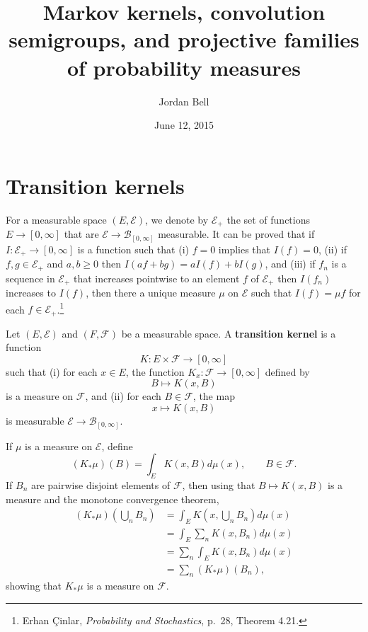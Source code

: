 \documentclass{article}
\theoremstyle{definition}
\begin{document}
\title{Markov kernels, convolution semigroups, and projective families of probability measures}
\author{Jordan Bell}
\date{June 12, 2015}

\maketitle


\section{Transition kernels}
For a measurable space $(E,\mathscr{E})$, we denote by $\mathscr{E}_+$ the set of functions $E \to [0,\infty]$
that are $\mathscr{E} \to \mathscr{B}_{[0,\infty]}$ measurable. 
It can be proved that if $I:\mathscr{E}_+ \to [0,\infty]$ is a function such that
(i) $f=0$ implies that $I(f)=0$, (ii) if $f,g \in \mathscr{E}_+$ and $a,b \geq 0$ then
$I(af+bg)=aI(f)+bI(g)$, and (iii)
if $f_n$ is a sequence in $\mathscr{E}_+$ that increases pointwise to an element $f$ of $\mathscr{E}_+$ then
$I(f_n)$ increases to $I(f)$,
then there a unique measure $\mu$ on $\mathscr{E}$ such that
$I(f)=\mu f$ for each $f \in \mathscr{E}_+$.\footnote{Erhan \c{C}inlar, {\em Probability and Stochastics}, p.~28, Theorem 4.21.}


Let $(E,\mathscr{E})$ and $(F,\mathscr{F})$ be a measurable space. A \textbf{transition kernel} is a function
\[
K:E \times \mathscr{F} \to [0,\infty]
\]
such that 
(i) for each $x \in E$, the function $K_x:\mathscr{F} \to [0,\infty]$ defined by
\[
B \mapsto K(x,B)
\]
is a   measure on $\mathscr{F}$, and (ii)
for each $B \in \mathscr{F}$,   the map
\[
x \mapsto K(x,B)
\]
is measurable $\mathscr{E} \to \mathscr{B}_{[0,\infty]}$.

If $\mu$ is a  measure on $\mathscr{E}$, define
\[
(K_* \mu)(B) = \int_E K(x,B) d\mu(x), \qquad B \in \mathscr{F}.
\]
If $B_n$ are pairwise disjoint elements of $\mathscr{F}$, then using that
$B \mapsto K(x,B)$ is a  measure and the monotone convergence theorem,
\begin{align*}
(K_* \mu)\left(\bigcup_n B_n \right)&=\int_E K\left(x, \bigcup_n B_n \right) d\mu(x)\\
&=\int_E \sum_n K(x,B_n) d\mu(x)\\
&=\sum_n \int_E K(x,B_n) d\mu(x)\\
&=\sum_n (K_* \mu)(B_n),
\end{align*}
showing that $K_*\mu$ is a  measure on $\mathscr{F}$.
\end{document}
